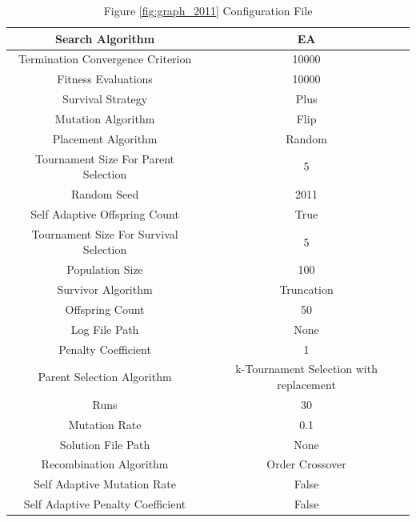 \documentclass{standalone}
\begin{document}
\clearpage
\begin{table}[!htb]
	\centering
	\caption{Figure \ref{fig:graph_2011} Configuration File}
	\label{tab:graph_2011}
	\begin{tabular}{| c | c |}
		\hline
		Search Algorithm		& EA		 \\
		\hline
		Termination Convergence Criterion		& 10000		 \\
		\hline
		Fitness Evaluations		& 10000		 \\
		\hline
		Survival Strategy		& Plus		 \\
		\hline
		Mutation Algorithm		& Flip		 \\
		\hline
		Placement Algorithm		& Random		 \\
		\hline
		Tournament Size For Parent Selection		& 5		 \\
		\hline
		Random Seed		& 2011		 \\
		\hline
		Self Adaptive Offspring Count		& True		 \\
		\hline
		Tournament Size For Survival Selection		& 5		 \\
		\hline
		Population Size		& 100		 \\
		\hline
		Survivor Algorithm		& Truncation		 \\
		\hline
		Offspring Count		& 50		 \\
		\hline
		Log File Path		& None		 \\
		\hline
		Penalty Coefficient		& 1		 \\
		\hline
		Parent Selection Algorithm		& k-Tournament Selection with replacement		 \\
		\hline
		Runs		& 30		 \\
		\hline
		Mutation Rate		& 0.1		 \\
		\hline
		Solution File Path		& None		 \\
		\hline
		Recombination Algorithm		& Order Crossover		 \\
		\hline
		Self Adaptive Mutation Rate		& False		 \\
		\hline
		Self Adaptive Penalty Coefficient		& False		 \\
		\hline
	\end{tabular}
\end{table}
\end{document}
